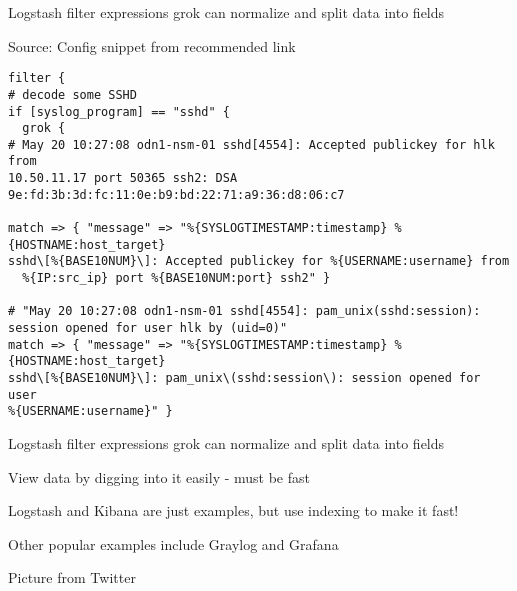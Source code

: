 \documentclass[Screen16to9,17pt]{foils}
\begin{document}
\begin{list2}
\item Logstash filter expressions grok can normalize and split data into fields
\end{list2}

Source:
Config snippet from recommended link\\
{\small{}}



{\footnotesize
\begin{verbatim}
filter {
# decode some SSHD
if [syslog_program] == "sshd" {
  grok {
# May 20 10:27:08 odn1-nsm-01 sshd[4554]: Accepted publickey for hlk from
10.50.11.17 port 50365 ssh2: DSA 9e:fd:3b:3d:fc:11:0e:b9:bd:22:71:a9:36:d8:06:c7

match => { "message" => "%{SYSLOGTIMESTAMP:timestamp} %{HOSTNAME:host_target}
sshd\[%{BASE10NUM}\]: Accepted publickey for %{USERNAME:username} from
  %{IP:src_ip} port %{BASE10NUM:port} ssh2" }

# "May 20 10:27:08 odn1-nsm-01 sshd[4554]: pam_unix(sshd:session):
session opened for user hlk by (uid=0)"
match => { "message" => "%{SYSLOGTIMESTAMP:timestamp} %{HOSTNAME:host_target}
sshd\[%{BASE10NUM}\]: pam_unix\(sshd:session\): session opened for user
%{USERNAME:username}" }
\end{verbatim}
}

\begin{list2}
\item Logstash filter expressions grok can normalize and split data into fields
\end{list2}





\begin{list1}
\item View data by digging into it easily - must be fast
\item Logstash and Kibana are just examples, but use indexing to make it fast!
\item Other popular examples include Graylog and Grafana
\end{list1}




Picture from Twitter\\
\\
\end{document}
